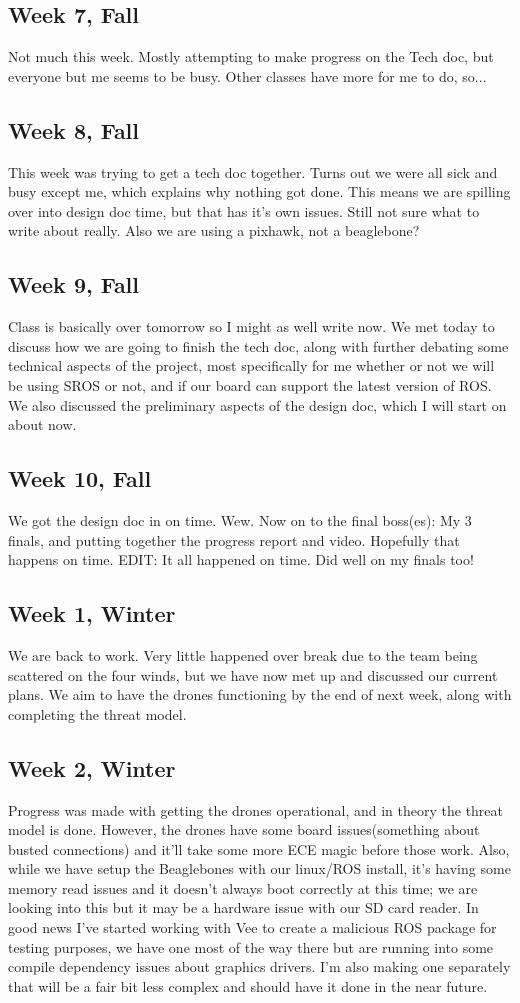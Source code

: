\documentclass[IEEEtran,letterpaper,10pt,notitlepage,draftclsnofoot,onecolumn]{article}
\begin{document}
\begin{sloppypar}
\subsection{Week 7, Fall}
Not much this week. Mostly attempting to make progress on the Tech doc, 
but everyone but me seems to be busy. Other classes have more for me to do, 
so...
\subsection{Week 8, Fall}
This week was trying to get a tech doc together. Turns out we were all sick 
and busy except me, which explains why nothing got done. This means we are 
spilling over into design doc time, but that has it's own issues. Still 
not sure what to write about really. Also we are using a pixhawk, not a 
beaglebone? 
\subsection{Week 9, Fall}
Class is basically over tomorrow so I might as well write now. We met 
today to discuss how we are going to finish the tech doc, along with 
further debating some technical aspects of the project, most specifically 
for me whether or not we will be using SROS or not, and if our board can 
support the latest version of ROS. We also discussed the preliminary aspects 
of the design doc, which I will start on about now.
\subsection{Week 10, Fall}
We got the design doc in on time. Wew. Now on to the final boss(es): My 3 
finals, and putting together the progress report and video. Hopefully that 
happens on time. EDIT: It all happened on time. Did well on my finals too!
\subsection{Week 1, Winter}
We are back to work. Very little happened over break due to the team being 
scattered on the four winds, but we have now met up and discussed our current 
plans. We aim to have the drones functioning by the end of next week, along 
with completing the threat model. 
\subsection{Week 2, Winter}
Progress was made with getting the drones operational, and in theory the threat 
model is done. However, the drones have some board issues(something about 
busted connections) and it'll take some more ECE magic before those work. 
Also, while we have setup the Beaglebones with our linux/ROS install, it's 
having some memory read issues and it doesn't always boot correctly at this 
time; we are looking into this but it may be a hardware issue with our SD card 
reader. In good news I've started working with Vee to create a malicious ROS 
package for testing purposes, we have one most of the way there but are running
into some compile dependency issues about graphics drivers. I'm also making one 
separately that will be a fair bit less complex and should have it done in the 
near future.

\end{sloppypar}
\end{document}
